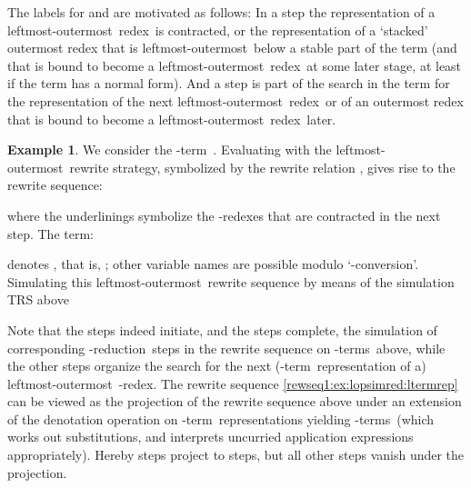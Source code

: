 \documentclass[
submission
]{dmtcs-episciences-tampered}
\newcommand{\nb}{\nobreakdash}
\newcommand{\lambdaterm}{\nb-term}
\newcommand{\lambdaterms}{\lambdaterm{s}}
\newcommand{\betareduction}{\nb-re\-duc\-tion}
\newcommand{\betaredex}{\nb-re\-dex}
\newcommand{\alphaconversion}{\nb-con\-ver\-sion}
\newcommand{\lo}{left\-most-outer\-most}
\newcommand{\loredex}{\lo\ re\-dex}
\theoremstyle{plain}
\theoremstyle{definition}
\newtheorem{example}[theorem]{Example}
\begin{document}
The labels for  and  are motivated as follows:
In a  step the representation of a \loredex\ is contracted,
or the representation of a `stacked' outermost redex that is \lo\ below a stable
part of the term (and  that is bound to become
a \loredex\ at some later stage, at least if the term has a normal form). 
And a  step is part of the search in the term 
for the representation of the next \loredex\ or of an outermost redex
that is bound to become a \loredex\ later.
 


  
  
  
  
\begin{example}\label{ex:lopsimred:ltermrep}
  We consider the \lambdaterm\
  .
  Evaluating  with the \lo\ rewrite strategy, symbolized by the rewrite relation , gives rise to the rewrite sequence:

where the underlinings symbolize the \betaredex{es} that are contracted in the next step. 
The term:
                           
  denotes , that is, ; other variable names are possible modulo `\alphaconversion'.                    
  Simulating this \lo\ rewrite sequence by means of the simulation TRS above
        
Note that the  steps indeed initiate, and the  steps complete,
  the simulation of corresponding \betareduction\ steps in the  rewrite sequence on \lambdaterms\ above,
  while the other steps organize the search for the next (\lambdaterm\ representation of a) \lo\ \betaredex.
  The  rewrite sequence \eqref{rewseq1:ex:lopsimred:ltermrep}
  can be viewed as the projection of the  rewrite sequence above
  under an extension of the denotation operation  on \lambdaterm\ representations yielding \lambdaterms\
  (which works out substitutions, and interprets uncurried application expressions  appropriately).
  Hereby  steps project to  steps,
  but all other steps vanish under the projection.
\end{example}
\end{document}
